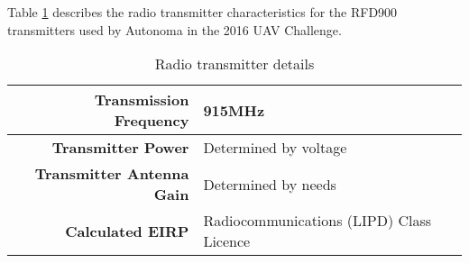 Table \ref{tab:radio} describes the radio transmitter characteristics for the RFD900 transmitters used by Autonoma in the 2016 UAV Challenge.

\begin{table}[H]
	\centering
	\begin{tabular}{|r|l|}
		\hline
		\textbf{Transmission Frequency}   & 915MHz \\ \hline
		\textbf{Transmitter Power}        & Determined by voltage \\ \hline
		\textbf{Transmitter Antenna Gain} & Determined by needs \\ \hline
		\textbf{Calculated EIRP}          & Radiocommunications (LIPD) Class Licence \\ \hline
	\end{tabular}
	\caption{Radio transmitter details}
	\label{tab:radio}
\end{table}